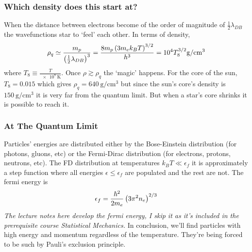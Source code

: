 \subsubsection{Which density does this start at?}
When the distance between electrons become of the order of magnitude of \(\frac{1}{2}\lambda_{DB}\) the wavefunctions star to `feel' each other. In terms of density,
\begin{equation}
    \rho_q \simeq \frac{m_p}{\left(\frac{1}{2}\lambda_{DB}\right)^3}=\frac{8m_p\left(3m_e k_B T\right)^{3/2}}{h^3} = \qty{e4}{}T_8^{3/2}\qty{}{\gram\per\centi\meter^3}
\end{equation}
where \(T_8 \equiv \frac{T}{\qty{e8}{\kelvin}}\). Once \(\rho \gtrsim \rho_q\) the `magic' happens. For the core of the sun, \(T_8 = 0.015\) which gives \(\rho_q = \qty{640}{\gram\per\centi\meter^3}\) but since the sun's core's density is \(\qty{150}{\gram\per\centi\meter^3}\) it is very far from the quantum limit. But when a star's core shrinks it is possible to reach it.
\subsubsection{At The Quantum Limit}
Particles' energies are distributed either by the Bose-Einstein distribution (for photons, gluons, etc) or the Fermi-Dirac distribution (for electrons, protons, neutrons, etc). The FD distribution at temperatures \(k_B T \ll \epsilon_f\) it is approximately a step function where all energies \(\epsilon \leq \epsilon_f\) are populated and the rest are not. The fermi energy is
\begin{equation}
    \epsilon_f = \frac{\hbar^2}{2m_e}\left(3\pi^2 n_e\right)^{2/3}
\end{equation}
\emph{The lecture notes here develop the fermi energy, I skip it as it's included in the prerequisite course Statistical Mechanics.} In conclusion, we'll find particles with high energy and momentum regardless of the temperature. They're being forced to be such by Pauli's exclusion principle.
